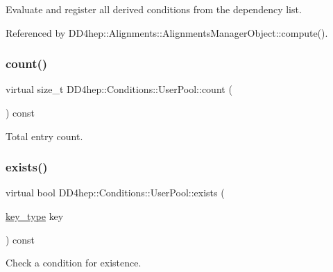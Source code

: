 Evaluate and register all derived conditions from the dependency list. 



Referenced by D\+D4hep\+::\+Alignments\+::\+Alignments\+Manager\+Object\+::compute().

\hypertarget{class_d_d4hep_1_1_conditions_1_1_user_pool_ac5f4c186c5037f379e3c12e2daa21a5e}{}\label{class_d_d4hep_1_1_conditions_1_1_user_pool_ac5f4c186c5037f379e3c12e2daa21a5e} 
\subsubsection{\texorpdfstring{count()}{count()}}
{\footnotesize\ttfamily virtual size\+\_\+t D\+D4hep\+::\+Conditions\+::\+User\+Pool\+::count (\begin{DoxyParamCaption}{ }\end{DoxyParamCaption}) const\hspace{0.3cm}{\ttfamily [pure virtual]}}



Total entry count. 

\hypertarget{class_d_d4hep_1_1_conditions_1_1_user_pool_abe05e40f8f674ff18a525b27012aa8d4}{}\label{class_d_d4hep_1_1_conditions_1_1_user_pool_abe05e40f8f674ff18a525b27012aa8d4} 
\subsubsection{\texorpdfstring{exists()}{exists()}\hspace{0.1cm}{\footnotesize\ttfamily [1/2]}}
{\footnotesize\ttfamily virtual bool D\+D4hep\+::\+Conditions\+::\+User\+Pool\+::exists (\begin{DoxyParamCaption}\item[{\hyperlink{class_d_d4hep_1_1_conditions_1_1_user_pool_aa256cf1e22de1b9f2a84d39309b8bfa9}{key\+\_\+type}}]{key }\end{DoxyParamCaption}) const\hspace{0.3cm}{\ttfamily [pure virtual]}}



Check a condition for existence. 

